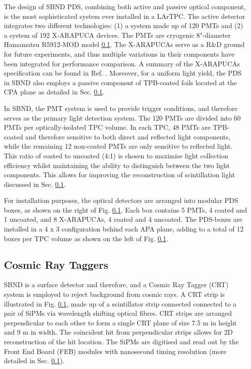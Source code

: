 The design of SBND PDS, combining both active and passive optical component, is the most sophisticated system ever installed in a LArTPC.
The active detector integrates two different technologies: (1) a system made up of 120 PMTs and (2) a system of 192 X-ARAPUCA devices.
The PMTs are cryogenic 8"-diameter Hamamatsu R5912-MOD model \ref{}.
The X-ARAPUCAs serve as a R\&D ground for future experiments, and thus multiple variations in their components have been integrated for performance comparison.
A summary of the X-ARAPUCAs specification can be found in Ref. \cite{}.
Moreover, for a uniform light yield, the PDS in SBND also employs a passive component of TPB-coated foils located at the CPA plane as detailed in Sec. \ref{}.

In SBND, the PMT system is used to provide trigger conditions, and therefore serves as the primary light detection system.
The 120 PMTs are divided into 60 PMTs per optically-isolated TPC volume. 
In each TPC, 48 PMTs are TPB-coated and therefore sensitive to both direct and reflected light components, while the remaining 12 non-coated PMTs are only sensitive to reflected light.
This ratio of coated to uncoated (4:1) is chosen to maximise light collection efficiency whilst maintaining the ability to distinguish between the two light components.
This allows for improving the reconstruction of scintillation light discussed in Sec. \ref{}. 

For installation purposes, the optical detectors are arranged into modular PDS boxes, as shown on the right of Fig. \ref{}.
Each box contains 5 PMTs, 4 coated and 1 uncoated, and 8 X-ARAPUCAs, 4 coated and 4 uncoated.
The PDS-boxes are installed in a 4 x 3 configuration behind each APA plane, adding to a total of 12 boxes per TPC volume as shown on the left of Fig. \ref{}.

\subsection{Cosmic Ray Taggers}


SBND is a surface detector and therefore, and a Cosmic Ray Tagger (CRT) system is employed to reject background from cosmic rays.
A CRT strip is illustrated in Fig. \ref{}, made up of a scintillator strip connected connected to a pair of SiPMs via wavelength shifting optical fibres.
CRT strips are arranged perpendicular to each other to form a single CRT plane of size 7.5 m in height and 9 m in width.
The coincident hit from perpendicular strips allows for 2D reconstruction of the hit location.
The SiPMs are digitised and read out by the Front End Board (FEB) modules with nanosecond timing resolution (more detailed in Sec. \ref{}).

